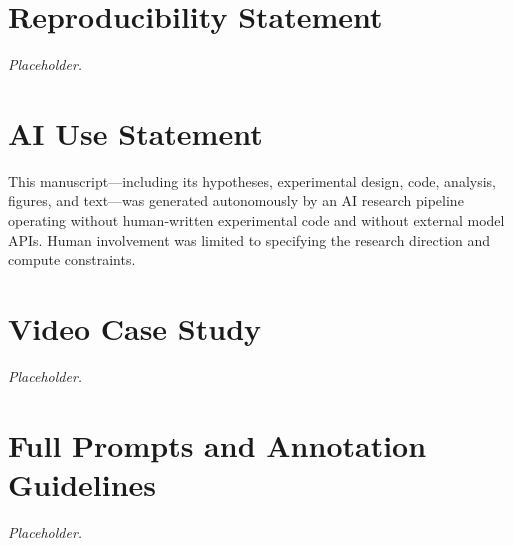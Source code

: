 \documentclass{article}
\begin{document}
\section*{Reproducibility Statement}
\emph{Placeholder.}

\section*{AI Use Statement}
\label{sec:disclosure}
This manuscript---including its hypotheses, experimental design, code, analysis,
figures, and text---was generated autonomously by an AI research pipeline operating
without human-written experimental code and without external model APIs. Human
involvement was limited to specifying the research direction and compute constraints.

\nocite{*}  %



\appendix

\section{Video Case Study}
\label{app:video}
\emph{Placeholder.}

\section{Full Prompts and Annotation Guidelines}
\label{app:prompts}
\emph{Placeholder.}
\end{document}
